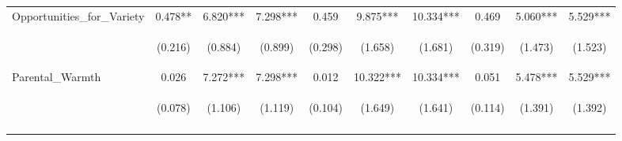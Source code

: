 \begin{tabular}{lccccccccc}
\noalign{\smallskip}Opportunities_for_Variety & 0.478** & 6.820*** & 7.298*** & 0.459 & 9.875*** & 10.334*** & 0.469 & 5.060*** & 5.529***\\
 & \begin{footnotesize}(0.216)\end{footnotesize} & \begin{footnotesize}(0.884)\end{footnotesize} & \begin{footnotesize}(0.899)\end{footnotesize} & \begin{footnotesize}(0.298)\end{footnotesize} & \begin{footnotesize}(1.658)\end{footnotesize} & \begin{footnotesize}(1.681)\end{footnotesize} & \begin{footnotesize}(0.319)\end{footnotesize} & \begin{footnotesize}(1.473)\end{footnotesize} & \begin{footnotesize}(1.523)\end{footnotesize}\\
\noalign{\smallskip}Parental_Warmth & 0.026 & 7.272*** & 7.298*** & 0.012 & 10.322*** & 10.334*** & 0.051 & 5.478*** & 5.529***\\
 & \begin{footnotesize}(0.078)\end{footnotesize} & \begin{footnotesize}(1.106)\end{footnotesize} & \begin{footnotesize}(1.119)\end{footnotesize} & \begin{footnotesize}(0.104)\end{footnotesize} & \begin{footnotesize}(1.649)\end{footnotesize} & \begin{footnotesize}(1.641)\end{footnotesize} & \begin{footnotesize}(0.114)\end{footnotesize} & \begin{footnotesize}(1.391)\end{footnotesize} & \begin{footnotesize}(1.392)\end{footnotesize}\\
\noalign{\smallskip}\hline\end{tabular}\\
